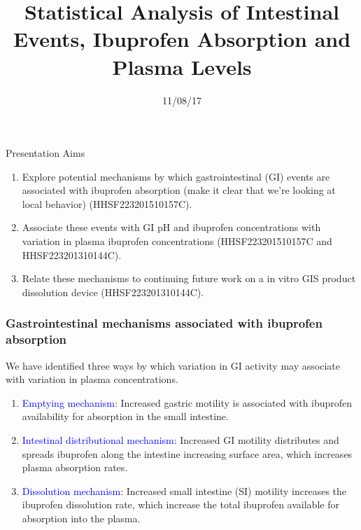 \documentclass[]{beamer}
\title{Statistical Analysis of Intestinal Events, Ibuprofen Absorption and Plasma Levels}
\date{11/08/17}
\begin{document}
\begin{frame}
  \titlepage
\end{frame}

\begin{frame}{Presentation Aims}

	\begin{enumerate}
		\setlength\itemsep{1.25em}
		\item Explore potential mechanisms by which gastrointestinal (GI) events are associated with ibuprofen absorption (make it clear that we're looking at local behavior) (HHSF223201510157C).
		\item Associate these events with GI pH and ibuprofen concentrations with variation in plasma ibuprofen concentrations (HHSF223201510157C and HHSF223201310144C).
		\item Relate these mechanisms to continuing future work on a in vitro GIS product dissolution device (HHSF223201310144C).
	\end{enumerate}

\end{frame}


\begin{frame}\frametitle{Gastrointestinal mechanisms associated with ibuprofen absorption}

	We have identified three ways by which variation in GI activity may associate with variation in plasma concentrations.

	\bigskip

	\begin{enumerate}
		\setlength\itemsep{1em}
		\item \textcolor{blue}{Emptying mechanism}: Increased gastric motility is associated with ibuprofen availability for absorption in the small intestine.
		\item \textcolor{blue}{Intestinal distributional mechanism}: Increased GI motility distributes and spreads ibuprofen along the intestine increasing surface area, which increases plasma absorption rates.
		\item \textcolor{blue}{Dissolution mechanism}: Increased small intestine (SI) motility increases the ibuprofen dissolution rate, which increase the total ibuprofen available for absorption into the plasma.
	\end{enumerate}


\end{frame}
\end{document}
